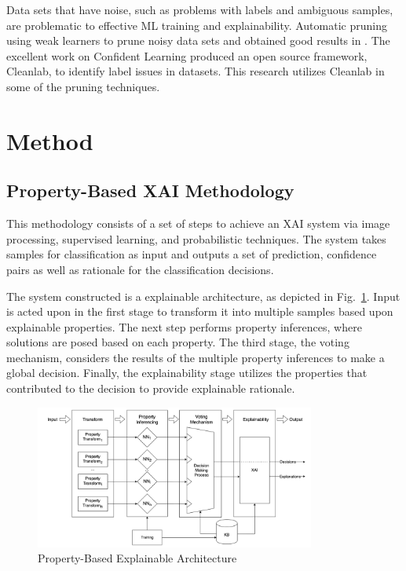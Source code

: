 \documentclass[conference]{IEEEtran}
\begin{document}
Data sets that have noise, such as problems with labels and ambiguous samples,
are problematic to effective ML training and explainability. Automatic pruning
using weak learners to prune noisy data sets and obtained good results in
\cite{angelova05}.  The excellent work on Confident Learning\cite{northcutt2021}
produced an open source framework, Cleanlab, to identify label issues in
datasets.  This research utilizes Cleanlab in some of the pruning techniques.

\section{Method}
\label{method}

\subsection{Property-Based XAI Methodology}

This methodology consists of a set of steps to achieve an XAI system via image
processing, supervised learning, and probabilistic techniques. The system takes
samples for classification as input and outputs a set of prediction, confidence
pairs as well as rationale for the classification decisions.

The system constructed is a explainable architecture, as depicted in
Fig.~\ref{fig:xai_data_pipeline}.  Input is acted upon in the first stage to
transform it into multiple samples based upon explainable properties.  The next
step performs property inferences, where solutions are posed based on each
property. The third stage, the voting mechanism, considers the results of the
multiple property inferences to make a global decision. Finally, the
explainability stage utilizes the properties that contributed to the decision to
provide explainable rationale.

\begin{figure}
    \includegraphics[width=9.2cm]{./images/xai-pipeline.png}
    \caption{Property-Based Explainable Architecture}
    \label{fig:xai_data_pipeline}
\end{figure}
\end{document}
